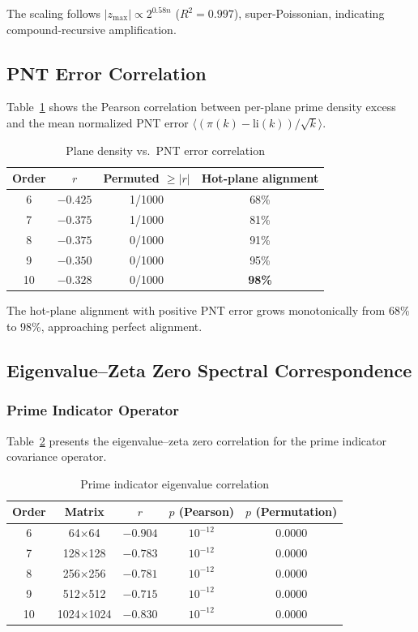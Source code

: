 \documentclass[11pt,a4paper]{article}
\begin{document}
The scaling follows $|z_{\max}| \propto 2^{0.58n}$ ($R^2 = 0.997$),
super-Poissonian, indicating compound-recursive amplification.

\subsection{PNT Error Correlation}

Table~\ref{tab:pnt} shows the Pearson correlation between per-plane
prime density excess and the mean normalized PNT error
$\langle(\pi(k)-\text{li}(k))/\sqrt{k}\rangle$.

\begin{table}[h]
\centering
\caption{Plane density vs.\ PNT error correlation}
\label{tab:pnt}
\begin{tabular}{cccc}
\toprule
Order & $r$ & Permuted $\geq |r|$ & Hot-plane alignment \\
\midrule
6  & $-0.425$ & 1/1000 & 68\% \\
7  & $-0.375$ & 1/1000 & 81\% \\
8  & $-0.375$ & 0/1000 & 91\% \\
9  & $-0.350$ & 0/1000 & 95\% \\
10 & $-0.328$ & 0/1000 & \textbf{98\%} \\
\bottomrule
\end{tabular}
\end{table}

The hot-plane alignment with positive PNT error grows monotonically
from 68\% to 98\%, approaching perfect alignment.

\subsection{Eigenvalue--Zeta Zero Spectral Correspondence}

\subsubsection{Prime Indicator Operator}

Table~\ref{tab:ev_prime} presents the eigenvalue--zeta zero correlation
for the prime indicator covariance operator.

\begin{table}[h]
\centering
\caption{Prime indicator eigenvalue correlation}
\label{tab:ev_prime}
\begin{tabular}{ccccc}
\toprule
Order & Matrix & $r$ & $p$ (Pearson) & $p$ (Permutation) \\
\midrule
6  & 64$\times$64     & $-0.904$ & $10^{-12}$ & 0.0000 \\
7  & 128$\times$128   & $-0.783$ & $10^{-12}$ & 0.0000 \\
8  & 256$\times$256   & $-0.781$ & $10^{-12}$ & 0.0000 \\
9  & 512$\times$512   & $-0.715$ & $10^{-12}$ & 0.0000 \\
10 & 1024$\times$1024 & $-0.830$ & $10^{-12}$ & 0.0000 \\
\bottomrule
\end{tabular}
\end{table}
\end{document}
